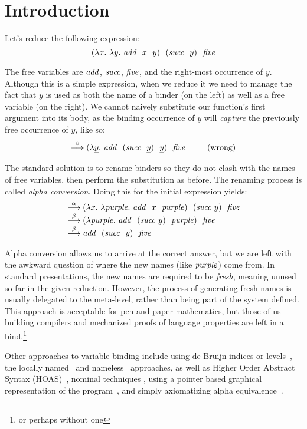\section{Introduction}

Let's reduce the following expression:
$$
(\lambda x.~ \lambda y.~ \mathit{add}~~ x~~ y)~~ (\mathit{succ}~~ y)~~ \mathit{five}
$$

The free variables are $\mathit{add}$, $\mathit{succ}$, $\mathit{five}$, and the right-most occurrence of $y$. Although this is a simple expression, when we reduce it we need to manage the fact that $y$ is used as both the name of a binder (on the left) as well as a free variable (on the right). We cannot naively substitute our function's first argument into its body, as the binding occurrence of $y$ will \emph{capture} the previously free occurrence of $y$, like so:
$$
\stackrel{\beta}{\longrightarrow}
(\lambda \underline{y}.~ \mathit{add}~~ (\mathit{succ}~~ \underline{y})~~ \underline{y})~~ \mathit{five}~~~~~~~~ \textrm{(wrong)}
$$

The standard solution is to rename binders so they do not clash with the names of free variables, then perform the substitution as before. The renaming process is called \emph{alpha conversion}. Doing this for the initial expression yields:
$$
\begin{array}{l}
\stackrel{\alpha}{\longrightarrow}
 (\lambda x.~ \lambda \mathit{purple}.~ \mathit{add}~~ x~~ \mathit{purple})~~ (\mathit{succ}~ y)~~ \mathit{five}
\\
\stackrel{\beta} {\longrightarrow}
 (\lambda \mathit{purple}.~ \mathit{add}~~  (\mathit{succ}~ y)~~ \mathit{purple})~~ \mathit{five}
\\
\stackrel{\beta} {\longrightarrow}
 \mathit{add}~~ (\mathit{succ}~~ y)~~ \mathit{five}
\end{array}
$$

Alpha conversion allows us to arrive at the correct answer, but we are left with the awkward question of where the new names (like $\mathit{purple}$) come from. In standard presentations, the new names are required to be \emph{fresh}, meaning unused so far in the given reduction. However, the process of generating fresh names is usually delegated to the meta-level, rather than being part of the system defined. This approach is acceptable for pen-and-paper mathematics, but those of us building compilers and mechanized proofs of language properties are left in a bind.\footnote{or perhaps without one}

Other approaches to variable binding include using de Bruijn indices or levels~\cite{deBruijn:nameless-dummies}, the locally named~\cite{Chargueraud:locally-nameless} and nameless~\cite{McKinna:pts-formalized} approaches, as well as Higher Order Abstract Syntax (HOAS)~\cite{Pfenning:hoas}, nominal techniques \cite{Pitts:nominal}, using a pointer based graphical representation of the program~\cite{Shivers:bottom-up-beta}, and simply axiomatizing alpha equivalence~\cite{Gordon:five-axioms}.

